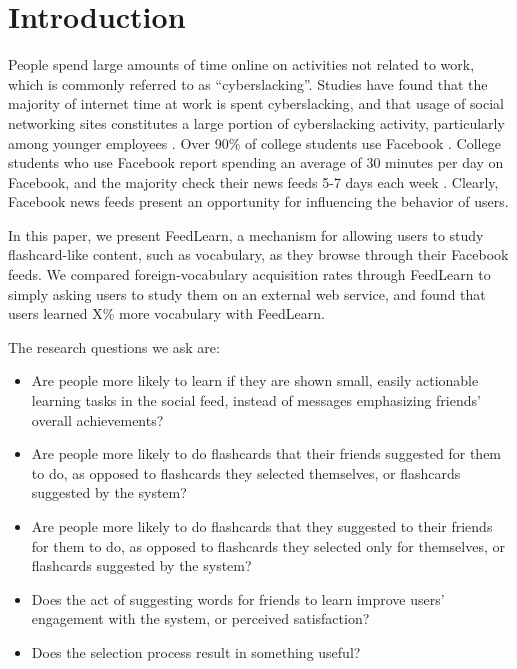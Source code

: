\documentclass{sigchi}
\begin{document}



\section{Introduction}

People spend large amounts of time online on activities not related to work,
which is commonly referred to as ``cyberslacking''.
Studies have found that the majority of internet time at work is spent cyberslacking,
and that usage of social networking sites
constitutes a large portion of cyberslacking activity, particularly among younger employees \cite{cyberslacking}. Over 90\% of college students use Facebook \cite{collegefacebook2}. College students who use Facebook report spending an average of 30 minutes per day on Facebook, and the majority check their news feeds 5-7 days each week \cite{collegefacebook}. Clearly, Facebook news feeds present an opportunity for influencing the behavior of users.

In this paper, we present FeedLearn, a mechanism for allowing users to study flashcard-like content, such as vocabulary, as they browse through their Facebook feeds. We compared foreign-vocabulary acquisition rates through FeedLearn to simply asking users to study them on an external web service, and found that users learned X\% more vocabulary with FeedLearn.

The research questions we ask are:

\begin{itemize}
\item Are people more likely to learn if they are shown small, easily actionable learning tasks in the social feed, instead of messages emphasizing friends' overall achievements?
\item  Are people more likely to do flashcards that their friends suggested for them to do, as opposed to flashcards they selected themselves, or flashcards suggested by the system?
\item  Are people more likely to do flashcards that they suggested to their friends for them to do, as opposed to flashcards they selected only for themselves, or flashcards suggested by the system?
\item Does the act of suggesting words for friends to learn improve users' engagement with the system, or perceived satisfaction?
\item Does the selection process result in something useful?
\end{itemize}
\end{document}
